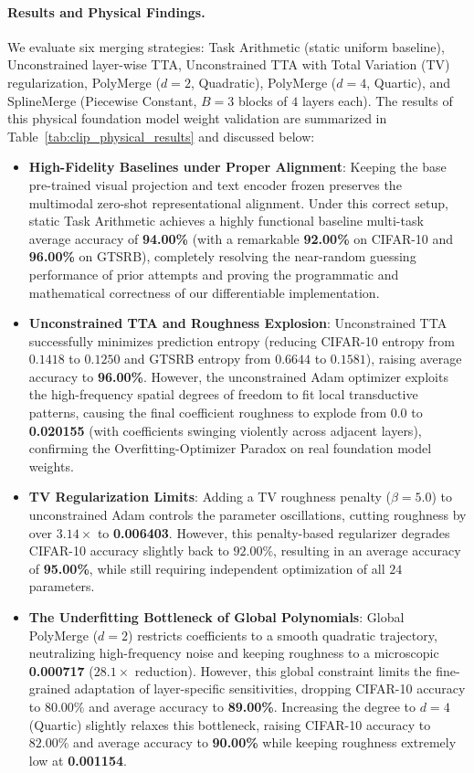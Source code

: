 \paragraph{Results and Physical Findings.} We evaluate six merging strategies: Task Arithmetic (static uniform baseline), Unconstrained layer-wise TTA, Unconstrained TTA with Total Variation (TV) regularization, PolyMerge ($d=2$, Quadratic), PolyMerge ($d=4$, Quartic), and SplineMerge (Piecewise Constant, $B=3$ blocks of $4$ layers each). The results of this physical foundation model weight validation are summarized in Table~\ref{tab:clip_physical_results} and discussed below:
\begin{itemize}
    \item \textbf{High-Fidelity Baselines under Proper Alignment}: Keeping the base pre-trained visual projection and text encoder frozen preserves the multimodal zero-shot representational alignment. Under this correct setup, static Task Arithmetic achieves a highly functional baseline multi-task average accuracy of \textbf{94.00\%} (with a remarkable \textbf{92.00\%} on CIFAR-10 and \textbf{96.00\%} on GTSRB), completely resolving the near-random guessing performance of prior attempts and proving the programmatic and mathematical correctness of our differentiable implementation.
    \item \textbf{Unconstrained TTA and Roughness Explosion}: Unconstrained TTA successfully minimizes prediction entropy (reducing CIFAR-10 entropy from $0.1418$ to $0.1250$ and GTSRB entropy from $0.6644$ to $0.1581$), raising average accuracy to \textbf{96.00\%}. However, the unconstrained Adam optimizer exploits the high-frequency spatial degrees of freedom to fit local transductive patterns, causing the final coefficient roughness to explode from $0.0$ to \textbf{0.020155} (with coefficients swinging violently across adjacent layers), confirming the Overfitting-Optimizer Paradox on real foundation model weights.
    \item \textbf{TV Regularization Limits}: Adding a TV roughness penalty ($\beta=5.0$) to unconstrained Adam controls the parameter oscillations, cutting roughness by over $3.14\times$ to \textbf{0.006403}. However, this penalty-based regularizer degrades CIFAR-10 accuracy slightly back to $92.00\%$, resulting in an average accuracy of \textbf{95.00\%}, while still requiring independent optimization of all $24$ parameters.
    \item \textbf{The Underfitting Bottleneck of Global Polynomials}: Global PolyMerge ($d=2$) restricts coefficients to a smooth quadratic trajectory, neutralizing high-frequency noise and keeping roughness to a microscopic \textbf{0.000717} ($28.1\times$ reduction). However, this global constraint limits the fine-grained adaptation of layer-specific sensitivities, dropping CIFAR-10 accuracy to $80.00\%$ and average accuracy to \textbf{89.00\%}. Increasing the degree to $d=4$ (Quartic) slightly relaxes this bottleneck, raising CIFAR-10 accuracy to $82.00\%$ and average accuracy to \textbf{90.00\%} while keeping roughness extremely low at \textbf{0.001154}.

\end{itemize}

